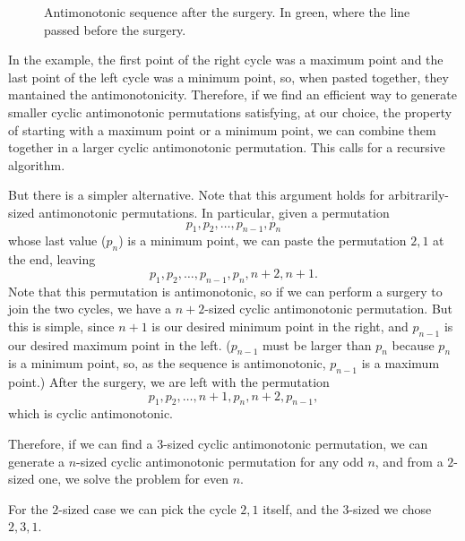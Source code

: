 \documentclass{article}
\begin{document}
\begin{figure}[h]
    \centering
    \caption[Antimonotonic sequence after the surgery.]{
        Antimonotonic sequence after the surgery.
        In green, where the line passed before the surgery.
    }
    \label{fig4}
\end{figure}

In the example,
the first point of the right cycle was a maximum point
and the last point of the left cycle was a minimum point,
so, when pasted together,
they mantained the antimonotonicity.
Therefore,
if we find an efficient way to generate smaller cyclic antimonotonic permutations
satisfying,
at our choice,
the property of starting with a maximum point or a minimum point,
we can combine them together in a larger cyclic antimonotonic permutation.
This calls for a recursive algorithm.

But there is a simpler alternative.
Note that this argument holds for arbitrarily-sized antimonotonic permutations.
In particular, given a permutation
\begin{equation*}
    p_1, p_2, \dots, p_{n-1}, p_n
\end{equation*}
whose last value ($p_n$) is a minimum point,
we can paste the permutation $2, 1$ at the end,
leaving
\begin{equation*}
    p_1, p_2, \dots, p_{n-1}, p_n, n+2, n+1.
\end{equation*}
Note that this permutation is antimonotonic,
so if we can perform a surgery to join the two cycles,
we have a $n+2$-sized cyclic antimonotonic permutation.
But this is simple, since $n+1$ is our desired minimum point in the right,
and $p_{n-1}$ is our desired maximum point in the left.
($p_{n-1}$ must be larger than $p_n$ because $p_n$ is a minimum point,
so, as the sequence is antimonotonic, $p_{n-1}$ is a maximum point.)
After the surgery, we are left with the permutation
\begin{equation*}
    p_1, p_2, \dots, n+1, p_n, n+2, p_{n-1},
\end{equation*}
which is cyclic antimonotonic.

Therefore, if we can find a $3$-sized cyclic antimonotonic permutation,
we can generate a $n$-sized cyclic antimonotonic permutation
for any odd $n$,
and from a $2$-sized one,
we solve the problem for even $n$.

For the $2$-sized case we can pick the cycle $2, 1$ itself,
and the $3$-sized we chose $2, 3, 1$.
\end{document}
